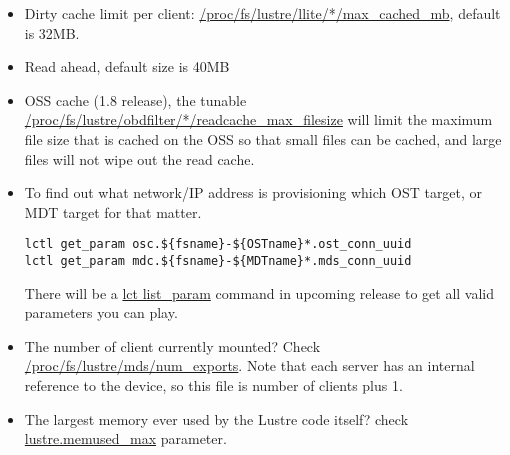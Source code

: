 \begin{itemize}
\begin{quote}
\end{quote}

\item Dirty cache limit per client:
\url{/proc/fs/lustre/llite/*/max_cached_mb}, default is 32MB.


\item Read ahead, default size is 40MB

\item OSS cache (1.8 release), the tunable
\url{/proc/fs/lustre/obdfilter/*/readcache_max_filesize} will limit the
maximum file size that is cached on the OSS so that small files can be cached,
and large files will not wipe out the read cache.



\item To find out what network/IP address is provisioning which OST target,
or MDT target for that matter.

\begin{Verbatim}
lctl get_param osc.${fsname}-${OSTname}*.ost_conn_uuid
lctl get_param mdc.${fsname}-${MDTname}*.mds_conn_uuid
\end{Verbatim}

There will be a \url{lct list_param} command in upcoming release to get all
valid parameters you can play.


\item The number of client currently mounted? Check
\url{/proc/fs/lustre/mds/num_exports}. Note that each server has an internal
reference to the device, so this file is number of clients plus 1.


\item The largest memory ever used by the Lustre code itself? check
\url{lustre.memused_max} parameter.


\end{itemize}





